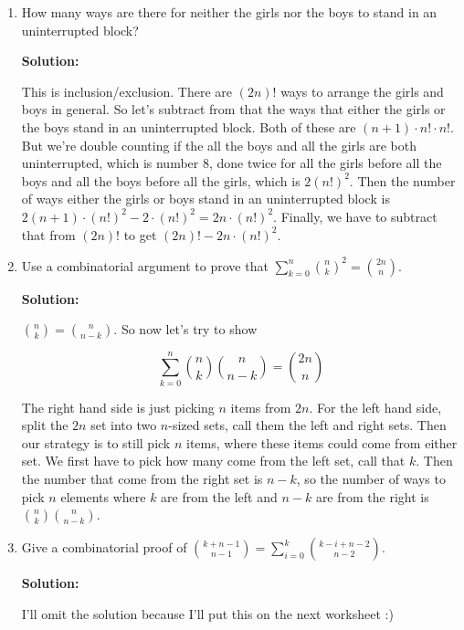 \documentclass{article}
\newenvironment{solution}{

        \color{blue} \smallskip \textbf{Solution:}

    }{}
\begin{document}
\begin{enumerate}
    \item How many ways are there for neither the girls nor the boys to stand in an uninterrupted block?
    \begin{solution}
    This is inclusion/exclusion. There are $(2n)!$ ways to arrange the girls and boys in general. So let's subtract from that
    the ways that either the girls or the boys stand in an uninterrupted block. Both of these are $(n+1) \cdot n! \cdot n!$.
    But we're double counting if the all the boys and all the girls are both uninterrupted, which is number 8, done twice for
    all the girls before all the boys and all the boys before all the girls, which is $2 (n!)^2$. Then the number of ways
    either the girls or boys stand in an uninterrupted block is $2 (n+1) \cdot (n!)^2 - 2 \cdot (n!)^2 = 2n \cdot (n!)^2$. Finally,
    we have to subtract that from $(2n)!$ to get $(2n)! - 2n \cdot (n!)^2$.
    \end{solution}

    \item Use a combinatorial argument to prove that $\sum_{k=0}^n {n \choose k}^2 = {2n \choose n}$.
    \begin{solution}
        ${n \choose k} = {n \choose n - k}$. So now let's try to show 

        \[
            \sum_{k=0}^n {n \choose k} {n \choose n -k } = {2n \choose n}
        \]

        The right hand side is just picking $n$ items from $2n$. For the left hand side, split the $2n$ set into two $n$-sized sets, call them the left and right sets.
        Then our strategy is to still pick $n$ items, where these items could come from either set. We first have to pick how many come from the left set,
        call that $k$. Then the number that come from the right set is $n-k$, so the number of ways to pick $n$ elements where $k$ are from the
        left and $n-k$ are from the right is ${n \choose k} {n \choose n-k}$.
    \end{solution}

    \item Give a combinatorial proof of ${k+n - 1 \choose n-1} = \sum_{i=0}^k {k-i+n-2 \choose n-2}$.
    \begin{solution}
    I'll omit the solution because I'll put this on the next worksheet :)
    \end{solution}

\end{enumerate}
\end{document}
